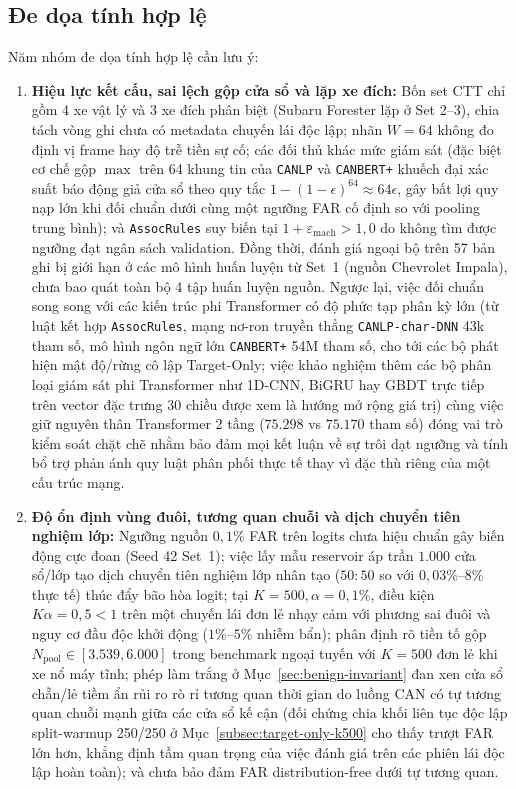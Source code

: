\documentclass[12pt, a4paper, reqno, oneside]{book}
\DeclareRobustCommand{\code}[1]{\nolinkurl{#1}}
\begin{document}
\subsection{Đe dọa tính hợp lệ}\label{sec:threats-to-validity}
Năm nhóm đe dọa tính hợp lệ cần lưu ý:
\begin{enumerate}
    \item \textbf{Hiệu lực kết cấu, sai lệch gộp cửa sổ và lặp xe đích:} Bốn set CTT chỉ gồm 4 xe vật lý và 3 xe đích phân biệt (Subaru Forester lặp ở Set 2--3), chia tách vòng ghi chưa có metadata chuyến lái độc lập; nhãn $W=64$ không đo định vị frame hay độ trễ tiền sự cố; các đối thủ khác mức giám sát (đặc biệt cơ chế gộp $\max$ trên 64 khung tin của \code{CANLP} và \code{CANBERT+} khuếch đại xác suất báo động giả cửa sổ theo quy tắc $1 - (1 - \epsilon)^{64} \approx 64\epsilon$, gây bất lợi quy nạp lớn khi đối chuẩn dưới cùng một ngưỡng FAR cố định so với pooling trung bình); và \code{AssocRules} suy biến tại $1 + \varepsilon_{\text{mach}} > 1{,}0$ do không tìm được ngưỡng đạt ngân sách validation. Đồng thời, đánh giá ngoại bộ trên 57 bản ghi bị giới hạn ở các mô hình huấn luyện từ Set~1 (nguồn Chevrolet Impala), chưa bao quát toàn bộ 4 tập huấn luyện nguồn. Ngược lại, việc đối chuẩn song song với các kiến trúc phi Transformer có độ phức tạp phân kỳ lớn (từ luật kết hợp \code{AssocRules}, mạng nơ-ron truyền thẳng \code{CANLP-char-DNN} 43k tham số, mô hình ngôn ngữ lớn \code{CANBERT+} 54M tham số, cho tới các bộ phát hiện mật độ/rừng cô lập Target-Only; việc khảo nghiệm thêm các bộ phân loại giám sát phi Transformer như 1D-CNN, BiGRU hay GBDT trực tiếp trên vector đặc trưng 30 chiều được xem là hướng mở rộng giá trị) cùng việc giữ nguyên thân Transformer 2 tầng ($75.298$ vs $75.170$ tham số) đóng vai trò kiểm soát chặt chẽ nhằm bảo đảm mọi kết luận về sự trôi dạt ngưỡng và tính bổ trợ phản ánh quy luật phân phối thực tế thay vì đặc thù riêng của một cấu trúc mạng.
    \item \textbf{Độ ổn định vùng đuôi, tương quan chuỗi và dịch chuyển tiên nghiệm lớp:} Ngưỡng nguồn $0{,}1\%$ FAR trên logits chưa hiệu chuẩn gây biến động cực đoan (Seed 42 Set~1); việc lấy mẫu reservoir áp trần $1.000$ cửa sổ/lớp tạo dịch chuyển tiên nghiệm lớp nhân tạo ($50:50$ so với $0{,}03\%\text{--}8\%$ thực tế) thúc đẩy bão hòa logit; tại $K=500, \alpha=0{,}1\%$, điều kiện $K\alpha = 0{,}5 < 1$ trên một chuyến lái đơn lẻ nhạy cảm với phương sai đuôi và nguy cơ đầu độc khởi động ($1\%\text{--}5\%$ nhiễm bẩn); phân định rõ tiền tố gộp $N_{\text{pool}} \in [3.539, 6.000]$ trong benchmark ngoại tuyến với $K=500$ đơn lẻ khi xe nổ máy tĩnh; phép làm trắng ở Mục~\ref{sec:benign-invariant} đan xen cửa sổ chẵn/lẻ tiềm ẩn rủi ro rò rỉ tương quan thời gian do luồng CAN có tự tương quan chuỗi mạnh giữa các cửa sổ kế cận (đối chứng chia khối liên tục độc lập split-warmup 250/250 ở Mục~\ref{subsec:target-only-k500} cho thấy trượt FAR lớn hơn, khẳng định tầm quan trọng của việc đánh giá trên các phiên lái độc lập hoàn toàn); và chưa bảo đảm FAR distribution-free dưới tự tương quan.

\end{enumerate}
\end{document}

